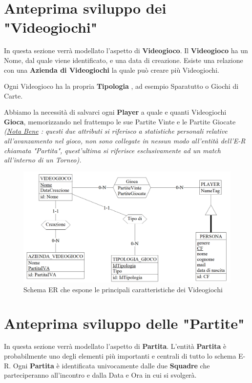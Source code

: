 \documentclass[a4paper,12pt]{report}
\begin{document}
\section{Anteprima sviluppo dei "Videogiochi"}
In questa sezione verrà modellato l'aspetto di \textbf{Videogioco}. 
Il \textbf{Videogioco} ha un Nome, dal quale viene identificato, e una data di creazione.
 Esiste una relazione con una \textbf{Azienda di Videogiochi} la quale può creare più Videogiochi.
 
 Ogni Videogioco ha la propria \textbf{Tipologia} , ad esempio Sparatutto o Giochi di Carte. 
 
 Abbiamo la necessità di salvarci ogni \textbf{Player} a quale e quanti Videogiochi \textbf{Gioca}, memorizzando nel frattempo le sue Partite Vinte e le Partite Giocate \textit{(\underline{Nota Bene} : questi due attributi si riferisco a statistiche personali relative all'avanzamento nel gioco, non sono collegate in nessun modo all'entità dell'E-R chiamata "Partita", quest'ultima si riferisce esclusivamente ad un match all'interno di un Torneo).}
\begin{figure}[!htb]
	\centerline{\includegraphics[scale=0.55]{img/ER_Videogiochi.png}}
	\caption{Schema ER che espone le principali caratteristiche dei Videogiochi}
	\label{img:ER_Videogiochi}
\end{figure}
\section{Anteprima sviluppo delle "Partite"}
In questa sezione verrà modellato l'aspetto di \textbf{Partita}.
L'entità \textbf{Partita} è probabilmente uno degli elementi più importanti e centrali di tutto lo schema E-R. Ogni \textbf{Partita} è identificata univocamente dalle due \textbf{Squadre} che parteciperanno all'incontro e dalla Data e Ora in cui si svolgerà.
\end{document}
